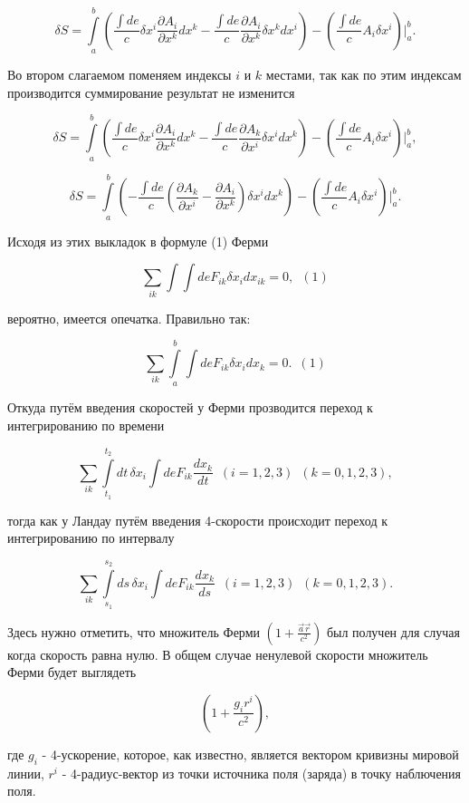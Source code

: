 \documentclass[11pt]{article}
\begin{document}
    \[\delta S = \int\limits_{a}^{b} \left(\frac{\int de}{c} \delta x^i \frac{\partial A_i}{\partial x^k} d x^k - \frac{\int de}{c}\frac{\partial A_i}{\partial x^k} \delta x^k d x^i\right) - \left(\frac{\int de}{c}A_i \delta x^i \right) \Bigg|_{a}^{b}.\]

    Во втором слагаемом поменяем индексы \(i\) и \(k\) местами, так как по
этим индексам производится суммирование результат не изменится

    \[\delta S = \int\limits_{a}^{b} \left(\frac{\int de}{c} \delta x^i \frac{\partial A_i}{\partial x^k} d x^k - \frac{\int de}{c}\frac{\partial A_k}{\partial x^i} \delta x^i d x^k\right) - \left(\frac{\int de}{c}A_i \delta x^i \right) \Bigg|_{a}^{b},\]

    \[\delta S = \int\limits_{a}^{b} \left( - \frac{\int de}{c}\left(\frac{\partial A_k}{\partial x^i} -\frac{\partial A_i}{\partial x^k}\right) \delta x^i d x^k\right) - \left(\frac{\int de}{c}A_i \delta x^i \right) \Bigg|_{a}^{b}.\]

    Исходя из этих выкладок в формуле (1) Ферми

    \[\sum_{ik} \int \int de F_{ik} \delta x_i dx_{ik} = 0, \,\,\,(1)\]

    вероятно, имеется опечатка. Правильно так:

    \[\sum_{ik} \int\limits_{a}^{b} \int de F_{ik} \delta x_i dx_{k} = 0. \,\,\,(1)\]

    Откуда путём введения скоростей у Ферми прозводится переход к
интегрированию по времени

    \[\sum_{ik} \int\limits_{t_1}^{t_2} dt \, \delta x_i \int de F_{ik}  \frac{dx_{k}}{dt} \,\,\,(i = 1,2,3)\,\,\,(k = 0,1,2,3),\]

    тогда как у Ландау путём введения 4-скорости происходит переход к
интегрированию по интервалу

    \[\sum_{ik} \int\limits_{s_1}^{s_2} ds \, \delta x_i \int de F_{ik}  \frac{dx_{k}}{ds} \,\,\,(i = 1,2,3)\,\,\,(k = 0,1,2,3).\]

    Здесь нужно отметить, что множитель Ферми
\(\left( 1 + \frac{\vec a \vec r}{c^2}\right)\) был получен для случая
когда скорость равна нулю. В общем случае ненулевой скорости множитель
Ферми будет выглядеть

\[\left( 1 + \frac{g_i r^i}{c^2}\right),\]

где \(g_i\) - 4-ускорение, которое, как известно, является вектором
кривизны мировой линии, \(r^i\) - 4-радиус-вектор из точки источника
поля (заряда) в точку наблючения поля.
\end{document}
